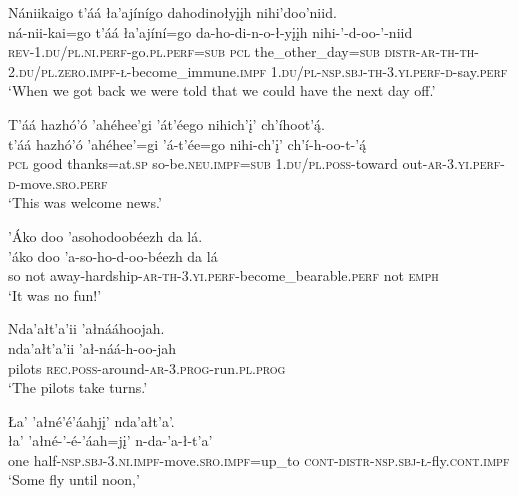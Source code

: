 \ea\label{ex:text9-10-1}
Nániikaigo t’áá ła’ajínígo dahodinołyįįh nihi’doo’niid.\\
\gll ná-nii-kai=go	t’áá	ła’ajíní=go	da-ho-di-n-o-ł-yįįh	nihi-’-d-oo-’-niid\\
     \textsc{rev}-1.\textsc{du}/\textsc{pl}.\textsc{ni}.\textsc{perf}-go.\textsc{pl}.\textsc{perf}=\textsc{sub}	\textsc{pcl}	the\_other\_day=\textsc{sub}	\textsc{distr}-\textsc{ar}-\textsc{th}-\textsc{th}-2.\textsc{du}/\textsc{pl}.\textsc{zero}.\textsc{impf}-\textsc{ł}-become\_immune.\textsc{impf}	1.\textsc{du}/\textsc{pl}-\textsc{nsp}.\textsc{sbj}-\textsc{th}-3.\textsc{yi}.\textsc{perf}-\textsc{d}-say.\textsc{perf}\\
\glt `When we got back we were told that we could have the next day off.'
\z

\ea\label{ex:text9-10-2}
T’áá hazhó’ó ’ahéhee’gi ’át’éego nihich’į’ ch’íhoot’ą́.\\
\gll t’áá hazhó’ó ’ahéhee’=gi	’á-t’ée=go	nihi-ch’į’	ch’í-h-oo-t-’ą́\\
     \textsc{pcl} good thanks=at.\textsc{sp}	so-be.\textsc{neu}.\textsc{impf}=\textsc{sub}	1.\textsc{du}/\textsc{pl}.\textsc{poss}-toward	out-\textsc{ar}-3.\textsc{yi}.\textsc{perf}-\textsc{d}-move.\textsc{sro}.\textsc{perf}\\
\glt `This was welcome news.'
\z

\ea\label{ex:text9-10-3}
’Áko doo ’asohodoobéezh da lá.\\
\gll ’áko	doo	’a-so-ho-d-oo-béezh	da	lá\\
     so	not	away-hardship-\textsc{ar}-\textsc{th}-3.\textsc{yi}.\textsc{perf}-become\_bearable.\textsc{perf}	not	\textsc{emph}\\
\glt `It was no fun!'
\z

\ea\label{ex:text9-10-4}
Nda’ałt’a’ii ’ałnááhoojah.\\
\gll nda’ałt’a’ii	’ał-náá-h-oo-jah\\
     pilots	\textsc{rec}.\textsc{poss}-around-\textsc{ar}-3.\textsc{prog}-run.\textsc{pl}.\textsc{prog}\\
\glt `The pilots take turns.'
\z

\ea\label{ex:text9-10-5}
Ła’ ’ałné’é’áahjį’ nda’ałt’a’.\\
\gll ła’	’ałné-’-é-’áah=jį’	n-da-’a-ł-t’a’\\
     one	half-\textsc{nsp}.\textsc{sbj}-3.\textsc{ni}.\textsc{impf}-move.\textsc{sro}.\textsc{impf}=up\_to	\textsc{cont}-\textsc{distr}-\textsc{nsp}.\textsc{sbj}-\textsc{ł}-fly.\textsc{cont}.\textsc{impf}\\
\glt `Some fly until noon,'
\z

